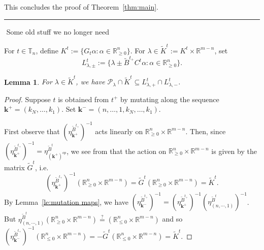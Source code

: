 \documentclass{amsart}
\newtheorem{lemma}[theorem]{Lemma}
\numberwithin{theorem}{section}
\newcommand{\bfk}{{\boldsymbol{k}}}
\newcommand{\cP}{\mathcal{P}}
\newcommand{\RR}{\mathbb{R}}
\newcommand{\TT}{\mathbb{T}}
\begin{document}
  This concludes the proof of Theorem~\ref{thm:main}.
$ $ 

\hrule

$ $
Some old stuff we no longer need

  For $t\in\TT_n$, define $K^t:=\{G_t\alpha:\alpha\in\RR_{\ge0}^n\}$.
  For $\lambda \in \widetilde K^t := K^t \times \RR^{m-n}$, set 
  \[L^t_{\lambda,\pm}:=\{\lambda \pm \widetilde B^{t_+} C^t\alpha:\alpha\in\RR_{\ge0}^n\}.\]
  \begin{lemma}
    For $\lambda\in \widetilde K^t$, we have $\cP_\lambda\cap \widetilde K^t\subseteq L^t_{\lambda,+}\cap L^t_{\lambda,-}$.
  \end{lemma}
  \begin{proof}
    Suppose $t$ is obtained from $t^+$ by mutating along the sequence $\bfk^+=(k_N,\ldots,k_1)$.
    Set $\bfk^-=(n,\ldots,1,k_N,\ldots,k_1)$.

    First observe that $\left(\eta^{\widetilde B^{t_+}}_{\bfk^+}\right)^{-1}$ acts linearly on $\RR_{\ge0}^n\times \RR^{m-n}$.
    Then, since $\left(\eta^{\widetilde B^{t_+}}_{\bfk^+}\right)^{-1}=\eta^{\widetilde B^t}_{(\bfk^+)^{op}}$, we see from \cite[Equation (1.13)]{nakanishi-zelevinsky} that the action on $\RR_{\ge0}^n\times \RR^{m-n}$ is given by the matrix $\widetilde G^t$, i.e. 
    \[\left(\eta^{\widetilde B^{t_+}}_{\bfk^+}\right)^{-1}(\RR_{\ge0}^n\times \RR^{m-n})=\widetilde G^t(\RR_{\ge0}^n\times \RR^{m-n})=\widetilde K^t.\]
    By Lemma~\ref{le:mutation maps}, we have $\left(\eta^{\widetilde B^{t_+}}_{\bfk^-}\right)^{-1}=\left(\eta^{\widetilde B^{t_+}}_{\bfk^+}\right)^{-1}\left(\eta^{\widetilde B^t}_{(n,\cdots,1)}\right)^{-1}$.
    But $\eta^{\widetilde B^t}_{(n,\cdots,1)}(\RR_{\ge0}^n\times \RR^{m-n})\stackrel{?}{=}(\RR_{\le0}^n\times \RR^{m-n})$ and so $\left(\eta^{\widetilde B^{t_+}}_{\bfk^-}\right)^{-1}(\RR_{\le0}^n\times \RR^{m-n})=-\widetilde G^t(\RR_{\le0}^n\times \RR^{m-n})=\widetilde K^t$.


\end{proof}
\end{document}

